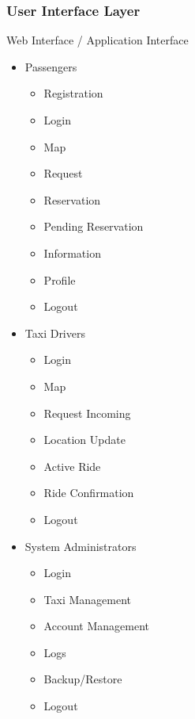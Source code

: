 \documentclass[11pt, a4paper,titlepage]{article}
\begin{document}
	\subsubsection{User Interface Layer}
	Web Interface / Application Interface
	\begin{itemize}
		\item Passengers
		\begin{itemize}
			\item Registration
			\item Login
			\item Map
			\item Request
			\item Reservation
			\item Pending Reservation
			\item Information
			\item Profile
			\item Logout
		\end{itemize}
		\item Taxi Drivers
		\begin{itemize}
			\item Login 
			\item Map
			\item Request Incoming 
			\item Location Update
			\item Active Ride
			\item Ride Confirmation
			\item Logout
		\end{itemize}
		\item  System Administrators
		\begin{itemize}
			\item Login
			\item Taxi Management
			\item Account Management
			\item Logs
			\item Backup/Restore
			\item Logout
		\end{itemize}
	\end{itemize}
\end{document}
